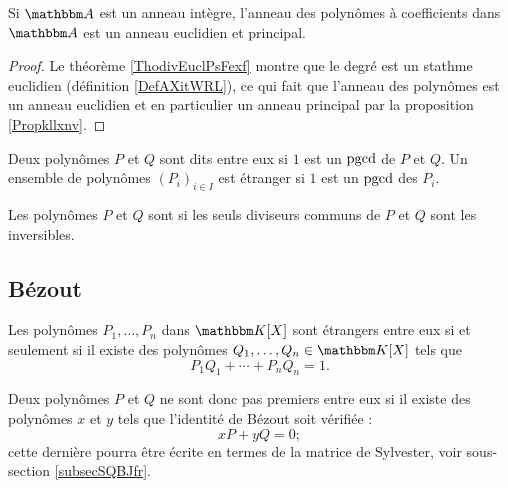 \begin{corollary}
    Si \( \eA\) est un anneau intègre, l'anneau des polynômes à coefficients dans \( \eA\) est un anneau euclidien et principal.
\end{corollary}

\begin{proof}
    Le théorème \ref{ThodivEuclPsFexf} montre que le degré est un stathme euclidien (définition \ref{DefAXitWRL}), ce qui fait que l'anneau des polynômes est un anneau euclidien et en particulier un anneau principal par la proposition \ref{Propkllxnv}. 
\end{proof}

\begin{definition}  \label{DefDSFooZVbNAX}
Deux polynômes \( P\) et \( Q\) sont dits  entre eux si \( 1\) est un \( \operatorname{pgcd}\) de \( P\) et \( Q\). Un ensemble de polynômes \( (P_i)_{i\in I}\) est étranger  si \( 1\) est un \( \operatorname{pgcd}\) des \( P_i\).
    
Les polynômes \( P\) et \( Q\) sont  si les seuls diviseurs communs de \( P\) et \( Q\) sont les inversibles.
\end{definition}

\subsection{Bézout}

\begin{theorem}[Bézout] \label{ThoBezoutOuGmLB}     
    Les polynômes \( P_1,\ldots,P_n\) dans \( \eK[X]\) sont étrangers entre eux si et seulement si il existe des polynômes \( Q_1,\ldots,Q_n\in\eK[X]\) tels que
    \begin{equation}
        P_1Q_1+\cdots+P_nQ_n=1.
    \end{equation}
\end{theorem}

Deux polynômes \( P\) et \( Q\) ne sont donc pas premiers entre eux si il existe des polynômes \( x\) et \( y\) tels que l'identité de Bézout soit vérifiée :
\begin{equation}    \label{EqkbbzAi}
    xP+yQ=0;
\end{equation}
cette dernière pourra être écrite en termes de la matrice de Sylvester, voir sous-section \ref{subsecSQBJfr}.

